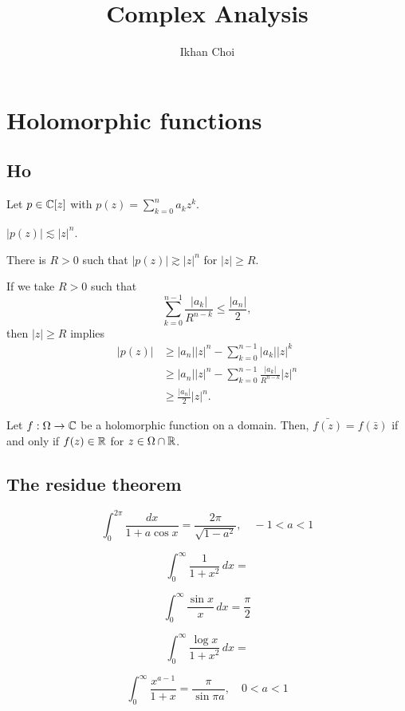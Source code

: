\documentclass{../note}
\begin{document}
\title{Complex Analysis}
\author{Ikhan Choi}
\maketitle
\tableofcontents



\chapter{Holomorphic functions}

\section{Ho}

\begin{prb}
Let $p\in\mathbb{C}[z]$ with $p(z)=\sum_{k=0}^na_kz^k$.
\begin{parts}
\item $|p(z)|\lesssim|z|^n$.
\item There is $R>0$ such that $|p(z)|\gtrsim|z|^n$ for $|z|\ge R$.
\end{parts}
\end{prb}
\begin{pf}
If we take $R>0$ such that
\[\sum_{k=0}^{n-1}\frac{|a_k|}{R^{n-k}}\le\frac{|a_n|}2,\]
then $|z|\ge R$ implies
\begin{align*}
|p(z)|&\ge|a_n||z|^n-\sum_{k=0}^{n-1}|a_k||z|^k\\
&\ge|a_n||z|^n-\sum_{k=0}^{n-1}\frac{|a_k|}{R^{n-k}}|z|^n\\
&\ge\frac{|a_n|}2|z|^n.
\end{align*}
\end{pf}

\begin{prb}
Let $f:\Omega\to\mathbb{C}$ be a holomorphic function on a domain.
Then, $\bar{f(z)}=f(\bar z)$ if and only if $f(z)\in\mathbb{R}$ for $z\in\Omega\cap\mathbb{R}$.
\end{prb}




\section{The residue theorem}


\[\int_0^{2\pi}\frac{dx}{1+a\cos x}=\frac{2\pi}{\sqrt{1-a^2}},\quad-1<a<1\]


\begin{prb}[Semicircles]
\begin{parts}
\item \[\int_0^\infty\frac1{1+x^2}\,dx=\]
\item \[\int_0^\infty\frac{\sin x}x\,dx=\frac\pi2\]
\item \[\int_0^\infty\frac{\log x}{1+x^2}\,dx=\]
\item \[\int_0^\infty\frac{x^{a-1}}{1+x}=\frac\pi{\sin\pi a},\quad0<a<1\]
\end{parts}
\end{prb}
\end{document}
